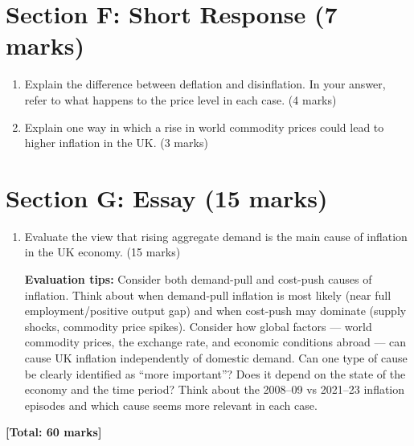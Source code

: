 \documentclass[12pt,a4paper]{article}
\begin{document}
\newpage

\section*{Section F: Short Response (7 marks)}

\begin{enumerate}[leftmargin=*, label=\textbf{\arabic*.}]

    \item Explain the difference between deflation and disinflation. In your answer, refer to what happens to the price level in each case. \hfill (4 marks)\\[6.5cm]

    \item Explain one way in which a rise in world commodity prices could lead to higher inflation in the UK. \hfill (3 marks)\\[5.5cm]

\end{enumerate}

\newpage

\section*{Section G: Essay (15 marks)}

\begin{enumerate}[leftmargin=*, label=\textbf{\arabic*.}]

    \item Evaluate the view that rising aggregate demand is the main cause of inflation in the UK economy. \hfill (15 marks)

    \vspace{0.8em}

    \begin{keypoint}
        \textbf{Evaluation tips:} Consider both demand-pull and cost-push causes of inflation. Think about when demand-pull inflation is most likely (near full employment/positive output gap) and when cost-push may dominate (supply shocks, commodity price spikes). Consider how global factors --- world commodity prices, the exchange rate, and economic conditions abroad --- can cause UK inflation independently of domestic demand. Can one type of cause be clearly identified as ``more important''? Does it depend on the state of the economy and the time period? Think about the 2008--09 vs 2021--23 inflation episodes and which cause seems more relevant in each case.
    \end{keypoint}

    \vspace{14cm}

\end{enumerate}

\vfill
\begin{center}
    \textbf{[Total: 60 marks]}
\end{center}
\end{document}
